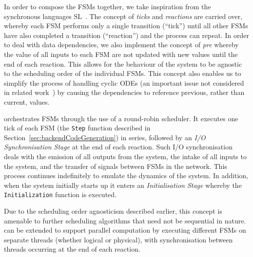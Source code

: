 In order to compose the \acp{FSM} together, we take inspiration
from the synchronous languages SL~\cite{SlLanguage}.  The 
concept of \emph{ticks} and \emph{reactions} are carried over, whereby each 
\ac{FSM} performs 
only a single transition (``tick'') until all other \acp{FSM} have also 
completed a transition (``reaction'') and the process can repeat.  In order to
deal with data dependencies, we also implement the concept of \emph{pre}
whereby the value of all inputs to each \ac{FSM} are not updated with
new values until the end of each reaction.  This allows for the behaviour of 
the system to be agnostic to the scheduling order of the individual 
\acp{FSM}.  This concept also enables us to simplify the process of 
handling cyclic \acp{ODE} (an important issue not considered in related 
work~\cite{kim2003modular}) by causing the dependencies to reference
previous, rather than current, values.

\ourTool orchestrates \acp{FSM} through the use of a round-robin
scheduler.  It executes one tick of each \ac{FSM} (the \texttt{Step} function 
described in Section~\ref{sec:backendCodeGeneration}) in series, followed by an 
\emph{I/O Synchronisation Stage} at the end of each reaction.  Such I/O 
synchronisation deals with the emission of all outputs from the system, the 
intake of all inputs to the system, and the transfer of signals between 
\acp{FSM} in the network.  This process continues indefinitely to emulate the 
dynamics of the system.  In addition, when the system initially starts up it 
enters an \emph{Initialisation Stage} whereby the \texttt{Initialization} 
function is executed.

Due to the scheduling order agnosticism described earlier, this concept is 
amenable to further scheduling algorithms that need not be sequential in 
nature.  \ourTool can be extended to support parallel computation by executing 
different \acp{FSM} on separate threads (whether logical or physical), with 
synchronisation between threads occurring at the end of each reaction.
